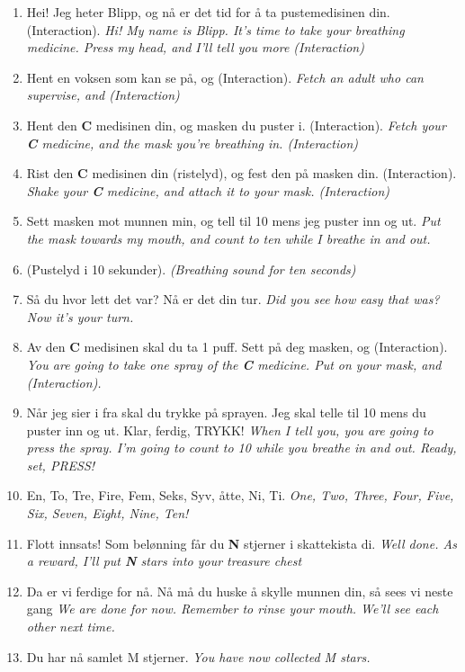 \begin{enumerate}
  \item Hei! Jeg heter Blipp, og n\r{a} er det tid for \r{a} ta pustemedisinen din.(Interaction). \emph{Hi! My name is Blipp. It's time to take your breathing medicine. Press my head, and I'll tell you more (Interaction)}
  \item Hent en voksen som kan se p\r{a}, og (Interaction). \emph{Fetch an adult who can supervise, and (Interaction)}
  \item Hent den \textbf{C} medisinen din, og masken du puster i. (Interaction). \emph{Fetch your \textbf{C} medicine, and the mask you're breathing in. (Interaction)}
  \item Rist den \textbf{C} medisinen din (ristelyd), og fest den p\r{a} masken din. (Interaction). \emph{Shake your \textbf{C} medicine, and attach it to your mask. (Interaction)}
  \item Sett masken mot munnen min, og tell til 10 mens jeg puster inn og ut. \emph{Put the mask towards my mouth, and count to ten while I breathe in and out. }
  \item (Pustelyd i 10 sekunder). \emph{(Breathing sound for ten seconds)}
  \item S\r{a} du hvor lett det var? N\r{a} er det din tur. \emph{Did you see how easy that was? Now it's your turn. }
  \item Av den \textbf{C} medisinen skal du ta 1 puff. Sett p\r{a} deg masken, og (Interaction). \emph{You are going to take one spray of the \textbf{C} medicine. Put on your mask, and (Interaction). }
  \item N\r{a}r jeg sier i fra skal du trykke p\r{a} sprayen. Jeg skal telle til 10 mens du puster inn og ut. Klar, ferdig, TRYKK! \emph{When I tell you, you are going to press the spray. I'm going to count to 10 while you breathe in and out. Ready, set, PRESS!}
  \item En, To, Tre, Fire, Fem, Seks, Syv, \r{a}tte, Ni, Ti. \emph{One, Two, Three, Four, Five, Six, Seven, Eight, Nine, Ten!}
  \item Flott innsats! Som belønning f\r{a}r du \textbf{N} stjerner i skattekista di. \emph{Well done. As a reward, I'll put \textbf{N} stars into your treasure chest} 
  \item Da er vi ferdige for n\r{a}. N\r{a} m\r{a} du huske \r{a} skylle munnen din, s\r{a} sees vi neste gang \emph{We are done for now. Remember to rinse your mouth. We'll see each other next time.}
  \item Du har n\r{a} samlet M stjerner. \emph{You have now collected M stars.}
\end{enumerate}


